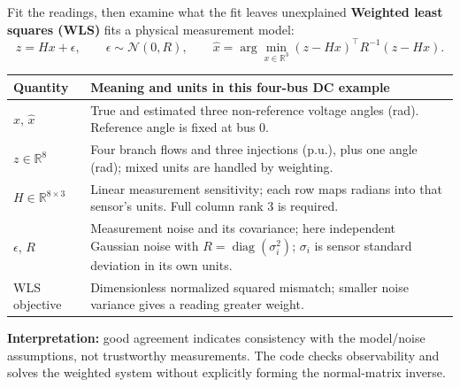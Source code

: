 \begin{frame}[t]{Fit the readings, then examine what the fit leaves unexplained}
\small
\textbf{Weighted least squares (WLS)} fits a physical measurement model:
\[
z=Hx+\epsilon,\qquad \epsilon\sim\mathcal N(0,R),\qquad
\hat x=\arg\min_{x\in\mathbb R^3}(z-Hx)^\top R^{-1}(z-Hx).
\]
\footnotesize
\renewcommand{\arraystretch}{1.02}
\begin{tabular}{@{}>{\raggedright\arraybackslash}p{.22\linewidth}>{\raggedright\arraybackslash}p{.70\linewidth}@{}}
\toprule Quantity & Meaning and units in this four-bus DC example \\
\midrule
$x$, $\hat x$ & True and estimated three non-reference voltage angles (rad). Reference angle is fixed at bus 0. \\
$z\in\mathbb R^8$ & Four branch flows and three injections (p.u.), plus one angle (rad); mixed units are handled by weighting. \\
$H\in\mathbb R^{8\times3}$ & Linear measurement sensitivity; each row maps radians into that sensor's units. Full column rank 3 is required. \\
$\epsilon$, $R$ & Measurement noise and its covariance; here independent Gaussian noise with $R=\operatorname{diag}(\sigma_i^2)$; $\sigma_i$ is sensor standard deviation in its own units. \\
WLS objective & Dimensionless normalized squared mismatch; smaller noise variance gives a reading greater weight. \\
\bottomrule
\end{tabular}
\smallskip\par\textbf{Interpretation:} good agreement indicates consistency with the model/noise assumptions, not trustworthy measurements. The code checks observability and solves the weighted system without explicitly forming the normal-matrix inverse.
\end{frame}

